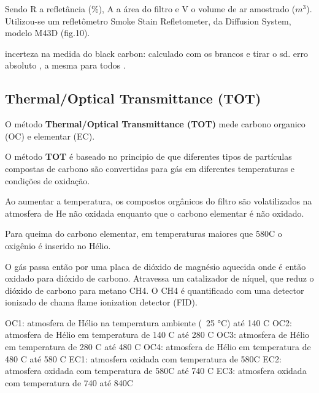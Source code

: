 
Sendo R a refletância (\%), A a área do filtro e V o volume de ar amostrado ($m^3$). 
Utilizou-se um refletômetro Smoke Stain Refletometer, da Diffusion System, modelo M43D (fig.10).

incerteza na medida do black carbon: calculado com os brancos e tirar o sd. 
erro absoluto , a mesma para todos .


\subsection{Thermal/Optical Transmittance (TOT)}
O método \textbf{Thermal/Optical Transmittance (TOT)} mede carbono organico (OC) e 
elementar (EC).

O método \textbf{TOT} é baseado no principio  de que diferentes tipos de partículas
compostas de carbono são convertidas para gás em diferentes temperaturas e condições
de oxidação.

Ao aumentar a temperatura, os compostos orgânicos do filtro são volatilizados 
na atmosfera de He não oxidada enquanto que o carbono elementar é não oxidado.

Para queima do carbono elementar, em temperaturas maiores que 580C o oxigênio é inserido no Hélio.  

O gás passa então por uma placa de dióxido de magnésio aquecida onde é então 
oxidado para dióxido de carbono. Atravessa um catalizador de níquel, que reduz o dióxido de carbono para metano CH4. 
O CH4 é quantificado com uma detector ionizado de chama flame ionization detector (FID).

OC1: atmosfera de Hélio na temperatura ambiente (~25 °C) até 140 C
OC2: atmosfera de Hélio em temperatura de 140 C até 280 C
OC3: atmosfera de Hélio em temperatura de 280 C até 480 C
OC4: atmosfera de Hélio em temperatura de 480 C até 580 C
EC1: atmosfera oxidada com temperatura de 580C
EC2: atmosfera oxidada com temperatura de 580C até 740 C
EC3: atmosfera oxidada com temperatura de 740 até 840C

